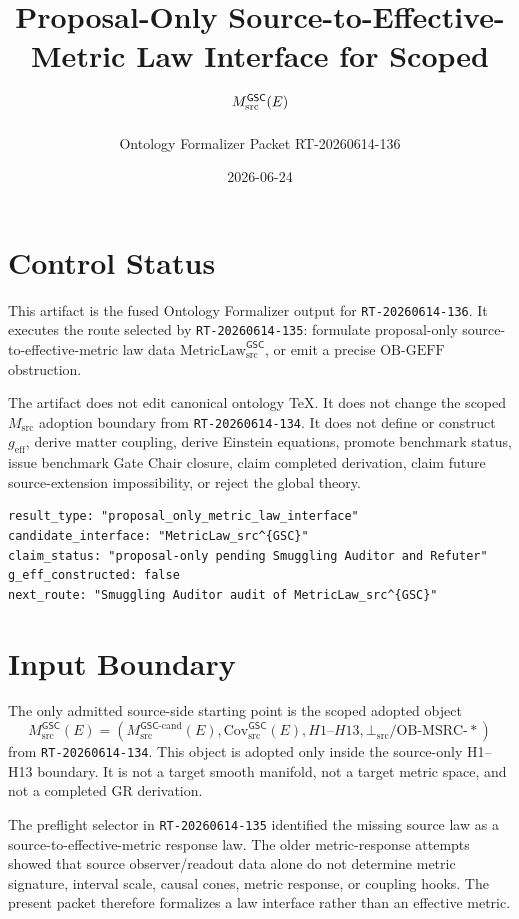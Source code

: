 \documentclass[11pt]{article}
\title{Proposal-Only Source-to-Effective-Metric Law Interface for Scoped \(\MsrcGSC(E)\)}
\author{Ontology Formalizer Packet RT-20260614-136}
\date{2026-06-24}
\newcommand{\Msrc}{M_{\mathrm{src}}}
\newcommand{\MsrcGSC}{M_{\mathrm{src}}^{\mathsf{GSC}}}
\newcommand{\Mgsccand}{M_{\mathrm{src}}^{\mathsf{GSC}\mbox{-}\mathrm{cand}}}
\newcommand{\CovSrc}{\mathrm{Cov}_{\mathrm{src}}^{\mathsf{GSC}}}
\newcommand{\MetricLaw}{\mathrm{MetricLaw}_{\mathrm{src}}^{\mathsf{GSC}}}
\newcommand{\BottomSrc}{\bot_{\mathrm{src}}}
\newcommand{\geff}{g_{\mathrm{eff}}}
\begin{document}
\maketitle

\section{Control Status}

This artifact is the fused Ontology Formalizer output for
\texttt{RT-20260614-136}. It executes the route selected by
\texttt{RT-20260614-135}: formulate proposal-only source-to-effective-metric
law data \(\MetricLaw\), or emit a precise \(\mathrm{OB\mbox{-}GEFF}\)
obstruction.

The artifact does not edit canonical ontology TeX. It does not change the
scoped \(\Msrc\) adoption boundary from \texttt{RT-20260614-134}. It does not
define or construct \(\geff\), derive matter coupling, derive Einstein
equations, promote benchmark status, issue benchmark Gate Chair closure, claim
completed derivation, claim future source-extension impossibility, or reject
the global theory.

\begin{verbatim}
result_type: "proposal_only_metric_law_interface"
candidate_interface: "MetricLaw_src^{GSC}"
claim_status: "proposal-only pending Smuggling Auditor and Refuter"
g_eff_constructed: false
next_route: "Smuggling Auditor audit of MetricLaw_src^{GSC}"
\end{verbatim}

\section{Input Boundary}

The only admitted source-side starting point is the scoped adopted object
\[
  \MsrcGSC(E)
  =
  \left(
    \Mgsccand(E),
    \CovSrc(E),
    H1\mbox{--}H13,
    \BottomSrc/\mathrm{OB\mbox{-}MSRC\mbox{-}*}
  \right)
\]
from \texttt{RT-20260614-134}. This object is adopted only inside the
source-only H1--H13 boundary. It is not a target smooth manifold, not a target
metric space, and not a completed GR derivation.

The preflight selector in \texttt{RT-20260614-135} identified the missing
source law as a source-to-effective-metric response law. The older
metric-response attempts showed that source observer/readout data alone do not
determine metric signature, interval scale, causal cones, metric response, or
coupling hooks. The present packet therefore formalizes a law interface rather
than an effective metric.
\end{document}
